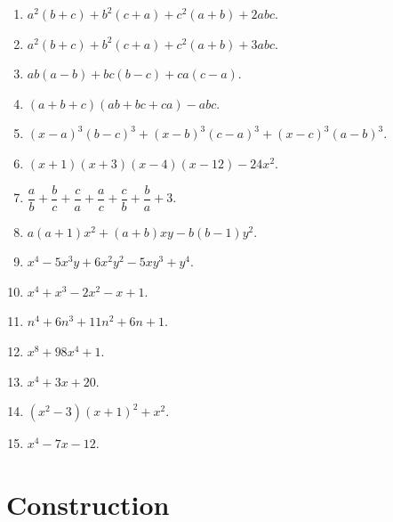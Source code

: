 \documentclass[11pt, a4paper]{article}
\begin{document}
\begin{enumerate}
	\item $ a^2(b+c) + b^2(c+a) + c^2(a+b) + 2abc $.

	\item $ a^2(b+c) + b^2(c+a) + c^2(a+b) + 3abc $.

	\item $ ab(a-b) + bc(b-c) + ca(c-a) $.

	\item $ (a+b+c)(ab+bc+ca) - abc $.
	
	\item $ (x-a)^3 (b-c)^3 + (x-b)^3 (c-a)^3 + (x-c)^3 (a-b)^3 $.

	\item $ (x+1) (x+3) (x-4) (x-12) - 24x^2 $.
	
	\item $ \dfrac{a}{b} + \dfrac{b}{c} + \dfrac{c}{a} + \dfrac{a}{c} + \dfrac{c}{b} + \dfrac{b}{a} + 3 $.
	
	\item $ a(a+1)x^2 + (a+b)xy - b(b-1)y^2 $.
	
	\item $ x^4 - 5x^3y + 6x^2y^2 - 5xy^3 + y^4  $.
	
	\item $ x^4 + x^3 - 2x^2 - x + 1  $.
	
	\item $ n^4 + 6n^3 + 11n^2 + 6n + 1 $.
	
	\item $ x^8 + 98x^4 + 1 $.

	\item $ x^4 + 3x +20 $.
	
	\item $ (x^2 - 3)(x + 1)^2 + x^2 $.
	
	\item $ x^4 - 7x - 12 $.



\end{enumerate}





\section{Construction}
\end{document}

